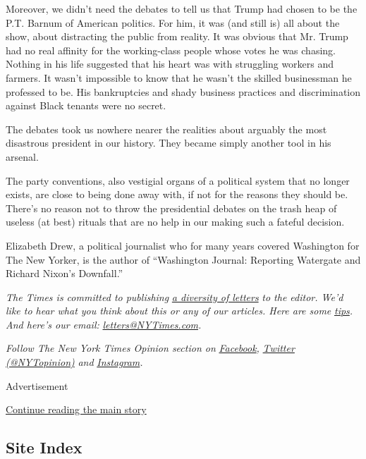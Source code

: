 Moreover, we didn't need the debates to tell us that Trump had chosen to
be the P.T. Barnum of American politics. For him, it was (and still is)
all about the show, about distracting the public from reality. It was
obvious that Mr. Trump had no real affinity for the working-class people
whose votes he was chasing. Nothing in his life suggested that his heart
was with struggling workers and farmers. It wasn't impossible to know
that he wasn't the skilled businessman he professed to be. His
bankruptcies and shady business practices and discrimination against
Black tenants were no secret.

The debates took us nowhere nearer the realities about arguably the most
disastrous president in our history. They became simply another tool in
his arsenal.

The party conventions, also vestigial organs of a political system that
no longer exists, are close to being done away with, if not for the
reasons they should be. There's no reason not to throw the presidential
debates on the trash heap of useless (at best) rituals that are no help
in our making such a fateful decision.

Elizabeth Drew, a political journalist who for many years covered
Washington for The New Yorker, is the author of ``Washington Journal:
Reporting Watergate and Richard Nixon's Downfall.''

\emph{The Times is committed to publishing}
\href{https://www.nytimes3xbfgragh.onion/2019/01/31/opinion/letters/letters-to-editor-new-york-times-women.html}{\emph{a
diversity of letters}} \emph{to the editor. We'd like to hear what you
think about this or any of our articles. Here are some}
\href{https://help.nytimes3xbfgragh.onion/hc/en-us/articles/115014925288-How-to-submit-a-letter-to-the-editor}{\emph{tips}}\emph{.
And here's our email:}
\href{mailto:letters@NYTimes.com}{\emph{letters@NYTimes.com}}\emph{.}

\emph{Follow The New York Times Opinion section on}
\href{https://www.facebookcorewwwi.onion/nytopinion}{\emph{Facebook}}\emph{,}
\href{http://twitter.com/NYTOpinion}{\emph{Twitter (@NYTopinion)}}
\emph{and}
\href{https://www.instagram.com/nytopinion/}{\emph{Instagram}}\emph{.}

Advertisement

\protect\hyperlink{after-bottom}{Continue reading the main story}

\hypertarget{site-index}{%
\subsection{Site Index}\label{site-index}}

